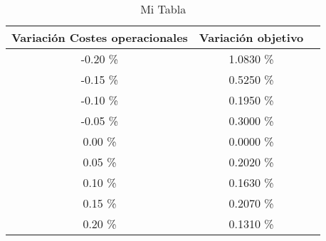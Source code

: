 \begin{table}
\centering
\begin{tabular}{|c|c|c|}
\hline
 Variación Costes operacionales & Variación objetivo \\ \hline
-0.20 \% & 1.0830 \% \\ \hline
-0.15 \% & 0.5250 \% \\ \hline
-0.10 \% & 0.1950 \% \\ \hline
-0.05 \% & 0.3000 \% \\ \hline
0.00 \% & 0.0000 \% \\ \hline
0.05 \% & 0.2020 \% \\ \hline
0.10 \% & 0.1630 \% \\ \hline
0.15 \% & 0.2070 \% \\ \hline
0.20 \% & 0.1310 \% \\ \hline
\end{tabular}
\caption{Mi Tabla}
\end{table}
